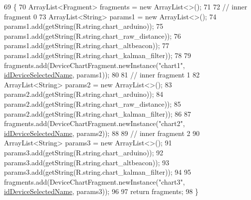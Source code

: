 \begin{DoxyCode}
69                                                \{
70         ArrayList<Fragment> fragments = \textcolor{keyword}{new} ArrayList<>();
71 
72         \textcolor{comment}{// inner fragment 0}
73         ArrayList<String> params1 = \textcolor{keyword}{new} ArrayList<>();
74         params1.add(getString(R.string.chart\_arduino));
75         params1.add(getString(R.string.chart\_raw\_distance));
76         params1.add(getString(R.string.chart\_altbeacon));
77         params1.add(getString(R.string.chart\_kalman\_filter));
78 
79         fragments.add(DeviceChartFragment.newInstance(\textcolor{stringliteral}{"chart1"}, 
      \hyperlink{classit_1_1unibo_1_1torsello_1_1bluetoothpositioning_1_1fragment_1_1DeviceDetailInner2Fragmet_a45380c45eac10e58571b19e50c9fc27c_a45380c45eac10e58571b19e50c9fc27c}{idDeviceSelectedName}, params1));
80 
81         \textcolor{comment}{// inner fragment 1}
82         ArrayList<String> params2 = \textcolor{keyword}{new} ArrayList<>();
83         params2.add(getString(R.string.chart\_arduino));
84         params2.add(getString(R.string.chart\_raw\_distance));
85         params2.add(getString(R.string.chart\_kalman\_filter));
86 
87         fragments.add(DeviceChartFragment.newInstance(\textcolor{stringliteral}{"chart2"}, 
      \hyperlink{classit_1_1unibo_1_1torsello_1_1bluetoothpositioning_1_1fragment_1_1DeviceDetailInner2Fragmet_a45380c45eac10e58571b19e50c9fc27c_a45380c45eac10e58571b19e50c9fc27c}{idDeviceSelectedName}, params2));
88 
89         \textcolor{comment}{// inner fragment 2}
90         ArrayList<String> params3 = \textcolor{keyword}{new} ArrayList<>();
91         params3.add(getString(R.string.chart\_arduino));
92         params3.add(getString(R.string.chart\_altbeacon));
93         params3.add(getString(R.string.chart\_kalman\_filter));
94 
95         fragments.add(DeviceChartFragment.newInstance(\textcolor{stringliteral}{"chart3"}, 
      \hyperlink{classit_1_1unibo_1_1torsello_1_1bluetoothpositioning_1_1fragment_1_1DeviceDetailInner2Fragmet_a45380c45eac10e58571b19e50c9fc27c_a45380c45eac10e58571b19e50c9fc27c}{idDeviceSelectedName}, params3));
96 
97         \textcolor{keywordflow}{return} fragments;
98     \}
\end{DoxyCode}
\hypertarget{classit_1_1unibo_1_1torsello_1_1bluetoothpositioning_1_1fragment_1_1DeviceDetailInner2Fragmet_a80972a8f816dc07e8844bea60b2438e1_a80972a8f816dc07e8844bea60b2438e1}{}\label{classit_1_1unibo_1_1torsello_1_1bluetoothpositioning_1_1fragment_1_1DeviceDetailInner2Fragmet_a80972a8f816dc07e8844bea60b2438e1_a80972a8f816dc07e8844bea60b2438e1} 
